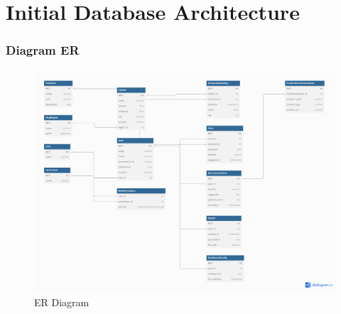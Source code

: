 \section{Initial Database Architecture}
\subsubsection*{Diagram ER}

\begin{figure}[H]
  \centering
  \includegraphics[width=\linewidth]{Imagenes/ER_Diagram.png}
  \caption{ER Diagram}
\end{figure}

